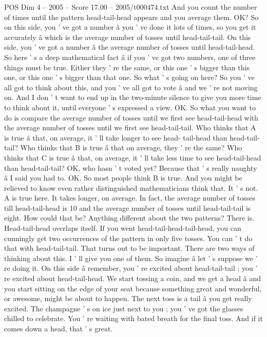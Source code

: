 \begin{textsample}{POS Dim 4 – 2005 – Score 17.00 – 2005/t000474.txt}
And you count the number of times until the pattern head-tail-head appears and you average them.
OK?
So on this side, you ' ve got a number â you ' ve done it lots of times, so you get it accurately â which is the average number of tosses until head-tail-tail.
On this side, you ' ve got a number â the average number of tosses until head-tail-head.
So here ' s a deep mathematical fact â if you ' ve got two numbers, one of three things must be true.
Either they ' re the same, or this one ' s bigger than this one, or this one ' s bigger than that one.
So what ' s going on here?
So you ' ve all got to think about this, and you ' ve all got to vote â and we ' re not moving on.
And I don ' t want to end up in the two-minute silence to give you more time to think about it, until everyone ' s expressed a view.
OK.
So what you want to do is compare the average number of tosses until we first see head-tail-head with the average number of tosses until we first see head-tail-tail.
Who thinks that A is true â that, on average, it ' ll take longer to see head- tail-head than head-tail-tail?
Who thinks that B is true â that on average, they ' re the same?
Who thinks that C is true â that, on average, it ' ll take less time to see head-tail-head than head-tail-tail?
OK, who hasn ' t voted yet?
Because that ' s really naughty â I said you had to.
OK.
So most people think B is true.
And you might be relieved to know even rather distinguished mathematicians think that.
It ' s not.
A is true here.
It takes longer, on average.
In fact, the average number of tosses till head-tail-head is 10 and the average number of tosses until head-tail-tail is eight.
How could that be?
Anything different about the two patterns?
There is.
Head-tail-head overlaps itself.
If you went head-tail-head-tail-head, you can cunningly get two occurrences of the pattern in only five tosses.
You can ' t do that with head-tail-tail.
That turns out to be important.
There are two ways of thinking about this.
I ' ll give you one of them.
So imagine â let ' s suppose we ' re doing it.
On this side â remember, you ' re excited about head-tail-tail ; you ' re excited about head-tail-head.
We start tossing a coin, and we get a head â and you start sitting on the edge of your seat because something great and wonderful, or awesome, might be about to happen.
The next toss is a tail â you get really excited.
The champagne ' s on ice just next to you ; you ' ve got the glasses chilled to celebrate.
You ' re waiting with bated breath for the final toss.
And if it comes down a head, that ' s great.

\end{textsample}

